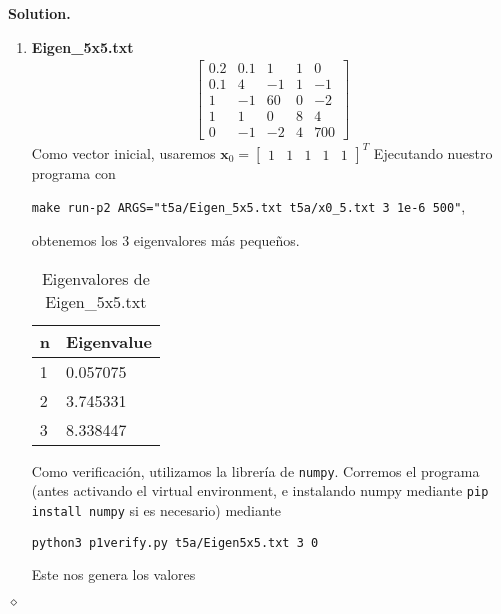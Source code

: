 \documentclass{article}
\theoremstyle{problemstyle}
\newenvironment{solution}{%
  \begin{mdframed}[linewidth=0.8pt,linecolor=Gray,backgroundcolor=Gray!5,roundcorner=5pt]%
  \noindent\textbf{Solution.}%
}{%
\hfill $ \diamond $ 
  \end{mdframed}%
}
\begin{document}
\begin{solution}
\begin{enumerate}
        \item \textbf{Eigen\_5x5.txt}
		      \begin{align*}
			      \begin{bmatrix}
				      0.2 & 0.1 & 1  & 1 & 0   \\
				      0.1 & 4   & -1 & 1 & -1  \\
				      1   & -1  & 60 & 0 & -2  \\
				      1   & 1   & 0  & 8 & 4   \\
				      0   & -1  & -2 & 4 & 700
			      \end{bmatrix}
		      \end{align*}
		      Como vector inicial, usaremos $ \mathbf{x}_0 = \begin{bmatrix}
				      1 & 1 & 1 & 1 & 1
			      \end{bmatrix}^{T} $
		      Ejecutando nuestro programa con
		      \begin{center}
			      \texttt{make run-p2
				      ARGS="t5a/Eigen\_5x5.txt t5a/x0\_5.txt 3 1e-6 500"},
		      \end{center}
		      obtenemos los 3 eigenvalores m\'as peque\~nos.
		      \begin{table}[H]
			      \begin{center}
				      \begin{tabular}{|l|l|}
                \hline
					      n & Eigenvalue \\
					      \hline
					      1 & 0.057075 \\
					      \hline
					      2 & 3.745331\\
					      \hline
					      3 & 8.338447   \\
					      \hline
				      \end{tabular}
			      \end{center}
			      \caption{Eigenvalores de Eigen\_5x5.txt}\label{tab:inv5x5}
		      \end{table}
		      Como verificaci\'on, utilizamos la librer\'ia de \texttt{numpy}. Corremos el programa (antes activando el virtual environment, e instalando numpy mediante \texttt{pip install numpy} si es necesario) mediante
		      \begin{center}
			      \texttt{python3 p1\textunderscore verify.py t5a/Eigen\textunderscore5x5.txt 3 0}
		      \end{center}
		      Este nos genera los valores
		      \begin{table}[H]
			      \begin{center}

\end{center}
\end{table}
\end{enumerate}
\end{solution}
\end{document}
